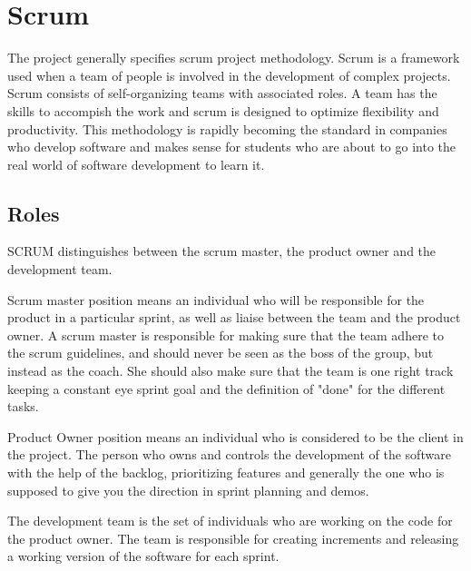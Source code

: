 \section{Scrum}
The project generally specifies scrum project methodology. Scrum is a framework used when a team of people is involved in the development of complex projects. Scrum consists of self-organizing teams with associated roles. A team has the skills to accompish the work and scrum is designed to optimize flexibility and productivity. This methodology is rapidly becoming the standard in companies who develop software and makes sense for students who are about to go into the real world of software development to learn it. 

\subsection{Roles}

SCRUM distinguishes between the scrum master, the product owner and the development team.

Scrum master position means an individual who will be responsible for the product in a
particular sprint, as well as liaise between the team and the product owner.
A scrum master is responsible for making sure that the team adhere to the scrum guidelines,
and should never be seen as the boss of the group, but instead as the coach.
She should also make sure that the team is one right track keeping a constant eye sprint goal
and the definition of "done" for the different tasks.

Product Owner position means an individual who is considered to be the client in the project.
The person who owns and controls the development of the software with the help of the backlog,
prioritizing features and generally the one who is supposed to give you the direction in sprint planning and demos.

The development team is the set of individuals who are working on the code for the product owner.
The team is responsible for creating increments and releasing a working version of the software
for each sprint.


